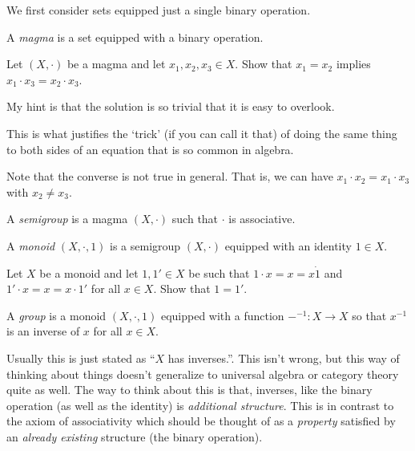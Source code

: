 We first consider sets equipped just a single binary operation.
\begin{dfn}[Magma]
A \emph{magma} is a set equipped with a binary operation.
\end{dfn}
\begin{exr}\label{exrA.1.34}
Let $(X,\cdot )$ be a magma and let $x_1,x_2,x_3\in X$.  Show that $x_1=x_2$ implies $x_1\cdot x_3=x_2\cdot x_3$.
\begin{rmk}
My hint is that the solution is so trivial that it is easy to overlook.
\end{rmk}
\begin{rmk}
This is what justifies the `trick' (if you can call it that) of doing the same thing to both sides of an equation that is so common in algebra.
\end{rmk}
\begin{rmk}
Note that the converse is not true in general.  That is, we can have $x_1\cdot x_2=x_1\cdot x_3$ with $x_2\neq x_3$.
\end{rmk}
\end{exr}
\begin{dfn}[Semigroup]\label{Semigroup}
A \emph{semigroup} is a magma $(X,\cdot )$ such that $\cdot$ is associative.
\end{dfn}
\begin{dfn}[Monoid]\label{Monoid}
A \emph{monoid} $(X,\cdot ,1)$ is a semigroup $(X,\cdot )$ equipped with an identity $1\in X$.
\end{dfn}
\begin{exr}\label{exrA.1.77}
Let $X$ be a monoid and let $1,1'\in X$ be such that $1\cdot x=x=x\dot 1$ and $1'\cdot x=x=x\cdot 1'$ for all $x\in X$.  Show that $1=1'$.
\end{exr}
\begin{dfn}[Group]\label{Group}
A \emph{group} is a monoid $(X,\cdot ,1)$ equipped with a function $-^{-1}:X\rightarrow X$ so that $x^{-1}$ is an inverse of $x$ for all $x\in X$.
\begin{rmk}
Usually this is just stated as ``$X$ has inverses.''.  This isn't wrong, but this way of thinking about things doesn't generalize to universal algebra or category theory quite as well.  The way to think about this is that, inverses, like the binary operation (as well as the identity) is \emph{additional structure}.  This is in contrast to the axiom of associativity which should be thought of as a \emph{property} satisfied by an \emph{already existing} structure (the binary operation).
\end{rmk}
\end{dfn}
